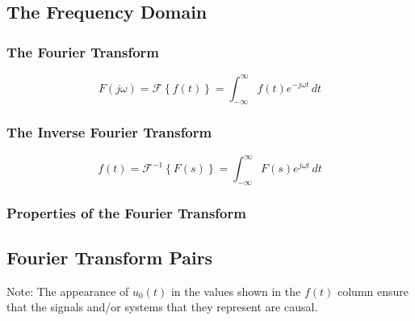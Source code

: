 \subsection*{The Frequency Domain}

\subsubsection*{The Fourier Transform}

$$
F(j\omega) = \mathcal{F}\left\{f(t)\right\} = \int_{-\infty}^{\infty} f(t)e^{-j\omega t}\,dt
$$

\subsubsection*{The Inverse Fourier Transform}

$$
f(t) = \mathcal{F}^{-1}\left\{F(s)\right\} = \int_{-\infty}^{\infty} F(s)e^{j\omega t}\,dt
$$


\subsubsection*{Properties of the Fourier Transform}



\subsection*{Fourier Transform Pairs}



\noindent Note: The appearance of $u_0(t)$ in the values shown in the $f(t)$ column ensure that 
the signals and/or systems that they represent are causal.
    
\endinput
